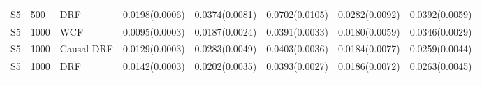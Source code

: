 \begin{longtable}{lllrrrrr}
S5 & 500 & DRF & 0.0198(0.0006) & 0.0374(0.0081) & 0.0702(0.0105) & 0.0282(0.0092) & 0.0392(0.0059) \\
\addlinespace
S5 & 1000 & WCF & 0.0095(0.0003) & 0.0187(0.0024) & 0.0391(0.0033) & 0.0180(0.0059) & 0.0346(0.0029) \\
S5 & 1000 & Causal-DRF & 0.0129(0.0003) & 0.0283(0.0049) & 0.0403(0.0036) & 0.0184(0.0077) & 0.0259(0.0044) \\
S5 & 1000 & DRF & 0.0142(0.0003) & 0.0202(0.0035) & 0.0393(0.0027) & 0.0186(0.0072) & 0.0263(0.0045) \\
\addlinespace
\midrule
\bottomrule
\end{longtable}
\endgroup
